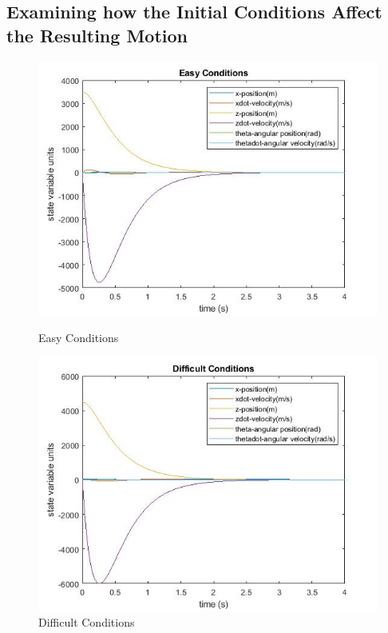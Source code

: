 \documentclass[a4paper,12pt]{article}
\begin{document}
\subsection{Examining how the Initial Conditions Affect the Resulting Motion}
\begin{figure}[H]
\centering
\begin{minipage}{.5\textwidth}
	\centering
	\includegraphics[width=.97\linewidth]{Easyconditions.jpg}
	\caption{Easy Conditions}
	\end{minipage}%
\begin{minipage}{.5\textwidth}
	\centering
	\includegraphics[width=.97\linewidth]{Difficultconditions.jpg}
	\caption{Difficult Conditions}
\end{minipage}
\end{figure}
\end{document}
